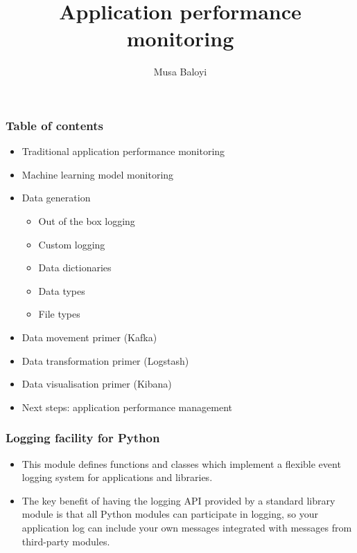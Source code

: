\documentclass[11pt]{beamer}
\begin{document}
	\author{Musa Baloyi}
	\title{Application performance monitoring}
	\begin{frame}[plain]
	\maketitle
\end{frame}

\begin{frame}
\frametitle{Table of contents}
\begin{itemize}
	\item Traditional application performance monitoring
	\item Machine learning model monitoring
	\item Data generation
	\begin{itemize}
		\item Out of the box logging
		\item Custom logging
		\item Data dictionaries
		\item Data types
		\item File types
	\end{itemize}
	\item Data movement primer (Kafka)
	\item Data transformation primer (Logstash)
	\item Data visualisation primer (Kibana)
	\item Next steps: application performance management
\end{itemize}
\end{frame}


\begin{frame}
\frametitle{Logging facility for Python}
\begin{itemize}
\item This module defines functions and classes which implement a flexible event logging system for applications and libraries.
\item The key benefit of having the logging API provided by a standard library module is that all Python modules can participate in logging, so your application log can include your own messages integrated with messages from third-party modules.
\end{itemize}
\end{frame}
\end{document}
